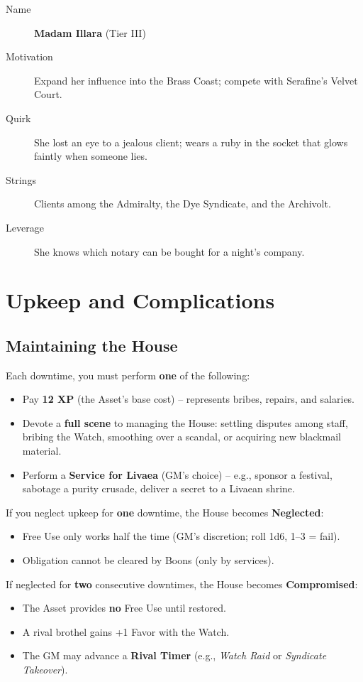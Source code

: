\documentclass[10pt,twoside]{book}
\begin{document}
\begin{description}
  \item[Name] \textbf{Madam Illara} (Tier III)
  \item[Motivation] Expand her influence into the Brass Coast; compete with Serafine's Velvet Court.
  \item[Quirk] She lost an eye to a jealous client; wears a ruby in the socket that glows faintly when someone lies.
  \item[Strings] Clients among the Admiralty, the Dye Syndicate, and the Archivolt.
  \item[Leverage] She knows which notary can be bought for a night's company.
\end{description}

\section{Upkeep and Complications}

\subsection{Maintaining the House}

Each downtime, you must perform \textbf{one} of the following:

\begin{itemize}
  \item Pay \textbf{12 XP} (the Asset's base cost) -- represents bribes, repairs, and salaries.
  \item Devote a \textbf{full scene} to managing the House: settling disputes among staff, bribing the Watch, smoothing over a scandal, or acquiring new blackmail material.
  \item Perform a \textbf{Service for Livaea} (GM's choice) -- e.g., sponsor a festival, sabotage a purity crusade, deliver a secret to a Livaean shrine.
\end{itemize}

If you neglect upkeep for \textbf{one} downtime, the House becomes \textbf{Neglected}:
\begin{itemize}
  \item Free Use only works half the time (GM's discretion; roll 1d6, 1--3 = fail).
  \item Obligation cannot be cleared by Boons (only by services).
\end{itemize}

If neglected for \textbf{two} consecutive downtimes, the House becomes \textbf{Compromised}:
\begin{itemize}
  \item The Asset provides \textbf{no} Free Use until restored.
  \item A rival brothel gains +1 Favor with the Watch.
  \item The GM may advance a \textbf{Rival Timer } (e.g., \textit{Watch Raid} or \textit{Syndicate Takeover}).
\end{itemize}
\end{document}
